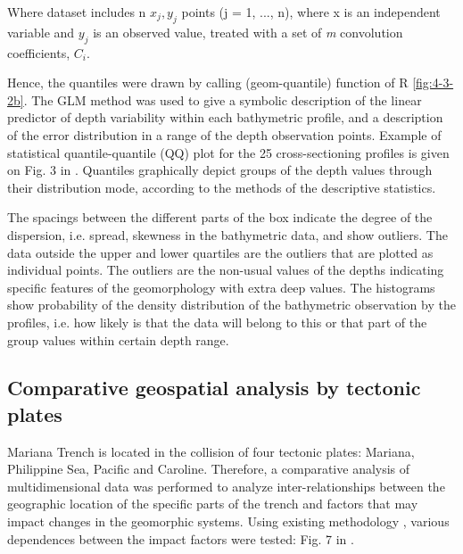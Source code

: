 \documentclass[11pt,a4paper]{report}
\begin{document}
{Where dataset includes n $x_{j}, y_{j}$ points (j = 1, ..., n), where x is an independent variable and $y_{j}$ is an observed value, treated with a set of \emph{m} convolution coefficients, $C_{i}$.

Hence, the quantiles were drawn by calling (geom-quantile) function of R \ref{fig:4-3-2b}. The \ac{GLM} method was used to give a symbolic description of the linear predictor of depth variability within each bathymetric profile, and a description of the error distribution in a range of the depth observation points. Example of statistical quantile-quantile (QQ) plot for the 25 cross-sectioning profiles is given on Fig. 3 in \cite{Lemenkova201988}. Quantiles graphically depict groups of the depth values through their distribution mode, according to the methods of the descriptive statistics. 

The spacings between the different parts of the box indicate the degree of the dispersion, i.e. spread, skewness in the bathymetric data, and show outliers. The data outside the upper and lower quartiles are the outliers that are plotted as individual points. The outliers are the non-usual values of the depths indicating specific features of the geomorphology with extra deep values. The histograms show probability of the density distribution of the bathymetric observation by the profiles, i.e. how likely is that the data will belong to this or that part of the group values within certain depth range.

\subsection{Comparative geospatial analysis by tectonic plates}\label{ssec:CA}
Mariana Trench is located in the collision of four tectonic plates: Mariana, Philippine Sea, Pacific and Caroline. Therefore, a comparative analysis of multidimensional data was performed to analyze inter-relationships between the geographic location of the specific parts of the trench and factors that may impact changes in the geomorphic systems. Using existing methodology \cite{Bretzetal2011}, various dependences between the impact factors were tested: Fig. 7 in \cite{Lemenkova201991}. 

}
\end{document}
